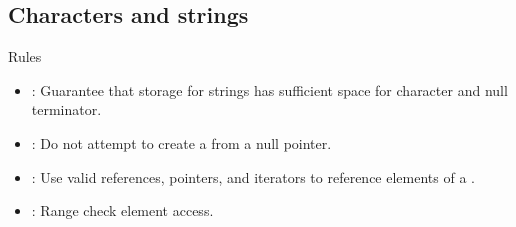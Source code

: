 \subsection{Characters and strings}

\begin{frame}[t]{Rules}
\begin{itemize}
  \item {}: 
        Guarantee that storage for strings has sufficient space for character and null terminator.
  \vfill
  \item {}: 
        Do not attempt to create a  from a null pointer.
  \vfill
  \item {}: 
        Use valid references, pointers, and iterators to reference elements of a .
  \vfill
  \item {}: 
        Range check element access.
\end{itemize}
\end{frame}


